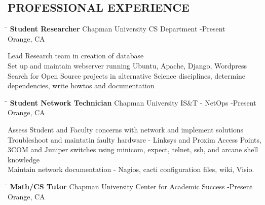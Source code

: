 \documentclass{res}
\begin{document}
\begin{resume}
\section{PROFESSIONAL EXPERIENCE}
   \vspace{-0.1in}	
   \begin{tabbing}
   \hspace{2.3in}\= \hspace{2.95in}\= \kill %
    {\bf Student Researcher} \>Chapman University CS Department     -Present\\
                             \>Orange, CA
   \end{tabbing}\vspace{-20pt}      %
	 Lead Research team in creation of database\\
	 Set up and maintain webserver running Ubuntu, Apache, Django, Wordpress\\
	 Search for Open Source projects in alternative Science disciplines, determine dependencies, write howtos and documentation\\
   \begin{tabbing}
   \hspace{2.3in}\= \hspace{2.95in}\= \kill %
    {\bf Student Network Technician} \>Chapman University IS\&T - NetOps -Present\\
                          \>Orange, CA
   \end{tabbing}\vspace{-20pt}
	 Assess Student and Faculty concerns with network and implement solutions\\
	 Troubleshoot and maintatin faulty hardware - Linksys and Proxim Access Points, 3COM and Juniper switches using minicom, expect, telnet, ssh, and arcane shell knowledge\\
	 Maintain network documentation - Nagios, cacti configuration files, wiki, Visio.\\
   \begin{tabbing}%
   \hspace{2.3in}\= \hspace{2.95in}\= \kill %
   {\bf Math/CS Tutor}  \>Chapman University Center for Academic Success -Present\\
                          \>Orange, CA
   \end{tabbing}\vspace{-20pt}

\end{resume}
\end{document}
